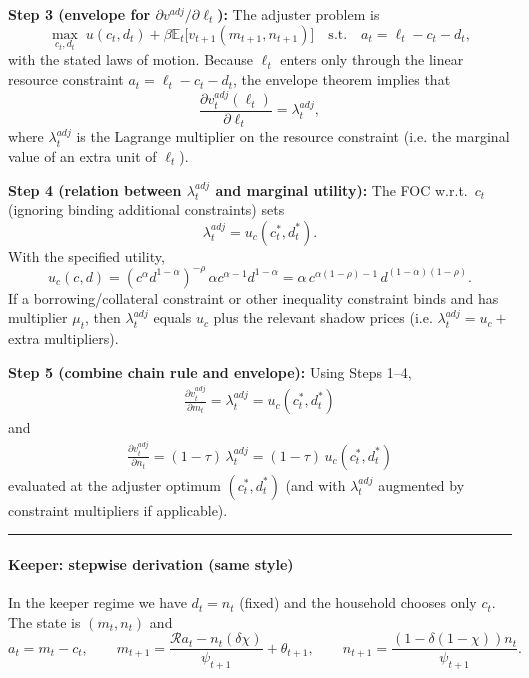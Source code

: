 \documentclass[\econtexMain]{subfiles}
\begin{document}
\textbf{Step 3 (envelope for \(\partial v^{adj}/\partial \ell_t\)):} The adjuster problem is
\[
\max_{c_t,d_t}\; u(c_t,d_t) + \beta\mathbb{E}_t\big[v_{t+1}(m_{t+1},n_{t+1})\big]
\quad\text{s.t.}\quad a_t = \ell_t - c_t - d_t,
\]
with the stated laws of motion. Because \(\ell_t\) enters only through the linear resource constraint \(a_t=\ell_t-c_t-d_t\), the envelope theorem implies that
\[
\frac{\partial v_t^{adj}(\ell_t)}{\partial \ell_t} = \lambda_t^{adj},
\]
where \(\lambda_t^{adj}\) is the Lagrange multiplier on the resource constraint (i.e. the marginal value of an extra unit of \(\ell_t\)).

\textbf{Step 4 (relation between \(\lambda_t^{adj}\) and marginal utility):} The FOC w.r.t.\ \(c_t\) (ignoring binding additional constraints) sets
\[
\lambda_t^{adj} = u_c(c_t^\ast,d_t^\ast).
\]
With the specified utility,
\[
u_c(c,d) = (c^\alpha d^{1-\alpha})^{-\rho}\,\alpha c^{\alpha-1} d^{1-\alpha}
= \alpha\, c^{\alpha(1-\rho)-1}\, d^{(1-\alpha)(1-\rho)}.
\]
If a borrowing/collateral constraint or other inequality constraint binds and has multiplier \(\mu_t\), then
\(\lambda_t^{adj}\) equals \(u_c\) plus the relevant shadow prices (i.e. \(\lambda_t^{adj}=u_c+\) extra multipliers).

\textbf{Step 5 (combine chain rule and envelope):} Using Steps 1--4,
\begin{align}
		\frac{\partial v_t^{adj}}{\partial m_t}
		= \lambda_t^{adj}
		= u_c(c_t^\ast,d_t^\ast)
\label{eq:adj_m}
\end{align}
and
\begin{align}
		\frac{\partial v_t^{adj}}{\partial n_t}
		= (1-\tau)\,\lambda_t^{adj}
		= (1-\tau)\,u_c(c_t^\ast,d_t^\ast)
\label{eq:adj_n}
\end{align}
evaluated at the adjuster optimum \((c_t^\ast,d_t^\ast)\) (and with \(\lambda_t^{adj}\) augmented by constraint multipliers if applicable).

\bigskip
\hrule
\bigskip

\paragraph{Keeper: stepwise derivation (same style)}

In the keeper regime we have \(d_t = n_t\) (fixed) and the household chooses only \(c_t\). The state is \((m_t,n_t)\) and
\[
a_t = m_t - c_t, \qquad
m_{t+1} = \frac{\mathcal{R}a_t - n_t(\delta\chi)}{\psi_{t+1}} + \theta_{t+1}, \qquad
n_{t+1} = \frac{(1-\delta(1-\chi))n_t}{\psi_{t+1}}.
\]
\end{document}
